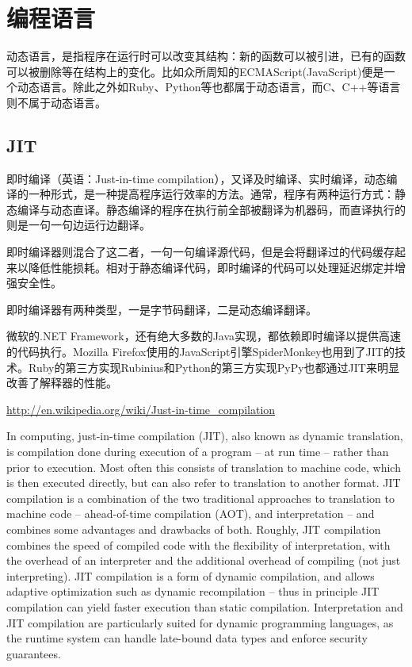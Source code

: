 \section{编程语言}

动态语言，是指程序在运行时可以改变其结构：新的函数可以被引进，已有的函数可以被删除等在结构上的变化。比如众所周知的ECMAScript(JavaScript)便是一个动态语言。除此之外如Ruby、Python等也都属于动态语言，而C、C++等语言则不属于动态语言。


\subsection{JIT}


即时编译（英语：Just-in-time compilation），又译及时编译、实时编译，动态编译的一种形式，是一种提高程序运行效率的方法。通常，程序有两种运行方式：静态编译与动态直译。静态编译的程序在执行前全部被翻译为机器码，而直译执行的则是一句一句边运行边翻译。

即时编译器则混合了这二者，一句一句编译源代码，但是会将翻译过的代码缓存起来以降低性能损耗。相对于静态编译代码，即时编译的代码可以处理延迟绑定并增强安全性。

即时编译器有两种类型，一是字节码翻译，二是动态编译翻译。

微软的.NET Framework，还有绝大多数的Java实现，都依赖即时编译以提供高速的代码执行。Mozilla Firefox使用的JavaScript引擎SpiderMonkey也用到了JIT的技术。Ruby的第三方实现Rubinius和Python的第三方实现PyPy也都通过JIT来明显改善了解释器的性能。

\url{http://en.wikipedia.org/wiki/Just-in-time_compilation}

In computing, just-in-time compilation (JIT), also known as dynamic translation, is compilation done during execution of a program – at run time – rather than prior to execution. Most often this consists of translation to machine code, which is then executed directly, but can also refer to translation to another format.
JIT compilation is a combination of the two traditional approaches to translation to machine code – ahead-of-time compilation (AOT), and interpretation – and combines some advantages and drawbacks of both. Roughly, JIT compilation combines the speed of compiled code with the flexibility of interpretation, with the overhead of an interpreter and the additional overhead of compiling (not just interpreting). JIT compilation is a form of dynamic compilation, and allows adaptive optimization such as dynamic recompilation – thus in principle JIT compilation can yield faster execution than static compilation. Interpretation and JIT compilation are particularly suited for dynamic programming languages, as the runtime system can handle late-bound data types and enforce security guarantees.

